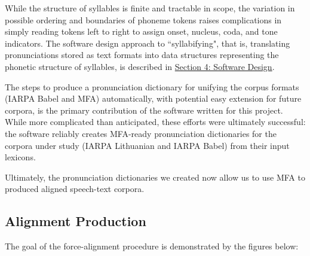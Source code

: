 \documentclass[11pt]{article}
\begin{document}
While the structure of syllables is finite and tractable in scope, the variation in possible ordering and boundaries of phoneme tokens raises complications in simply reading tokens left to right to assign onset, nucleus, coda, and tone indicators. The software design approach to ``syllabifying", that is, translating pronunciations stored as text formats into data structures representing the phonetic structure of syllables, is described in \hyperlink{section.4}{Section 4: Software Design}.

The steps to produce a pronunciation dictionary for unifying the corpus formats (IARPA Babel and MFA) automatically, with potential easy extension for future corpora, is the primary contribution of the software written for this project. While more complicated than anticipated, these efforts were ultimately successful: the software reliably creates MFA-ready pronunciation dictionaries for the corpora under study (IARPA Lithuanian and IARPA Babel) from their input lexicons. 

Ultimately, the pronunciation dictionaries  we created now allow us to use MFA to produced aligned speech-text corpora.

\subsection{Alignment Production}

The goal of the force-alignment procedure is demonstrated by the figures below:
\end{document}
